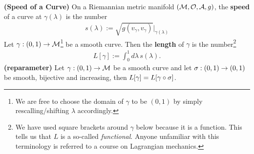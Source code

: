 \documentclass[12pt]{article} %
\newcommand{\bfs}[1]{\textbf{({#1}) }}
\begin{document}
\bd\bfs{Speed of a Curve}
    On a Riemannian metric manifold $(\mathcal{M},\mathcal{O},\mathcal{A},g)$, the \textbf{speed} of a curve at $\gamma(\lambda)$ is the number 
    \begin{align*}
        s(\lambda) := \sqrt{g(v_{\gamma},v_{\gamma})}\Big|_{\gamma(\lambda)}
    \end{align*}
\ed  
\bd
    Let $\gamma: (0,1) \to \mathcal{M}$\footnote{We are free to choose the domain of $\gamma$ to be $(0,1)$ by simply rescalling/shifting $\lambda$ accordingly.} be a smooth curve. Then the \textbf{length} of $\gamma$ is the number\footnote{We have used square brackets around $\gamma$ below because it is a function. This tells us that $L$ is a so-called \textit{functional}. Anyone unfamiliar with this terminology is referred to a course on Lagrangian mechanics.}
    \begin{align*}
        L[\gamma] := \int_0^1 d\lambda \, s(\lambda).
    \end{align*}
\ed 
\bt \bfs{reparameter}
    Let $\gamma:(0,1) \to \mathcal{M}$ be a smooth curve and let $\sigma:(0,1)\to(0,1)$ be smooth, bijective and increasing, then $L[\gamma] = L[\gamma\circ\sigma]$.
\et 
\end{document}
